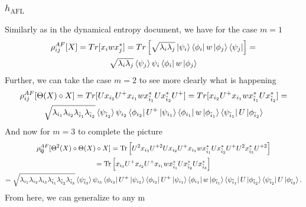 \documentclass{article}
\newcommand{\afl}{h_{\text{AFL}}}
\begin{document}
\subsubsection{$\afl$}
Similarly as in the dynamical entropy document, we have for the case $m = 1$ \begin{multline}
    \rho_{ij}^{AF}[X] = Tr[x_iwx_j^*] = Tr\left[\sqrt{\lambda_i\lambda_j}\ket{\psi_i}\bra{\phi_i}w\ket{\phi_j}\bra{\psi_j}\right] = \\\sqrt{\lambda_i\lambda_j} \braket{\psi_j}{\psi_i}\bra{\phi_i}w\ket{\phi_j}
\end{multline}
Further, we can take the case $m = 2$ to see more clearly what is happening
\begin{multline}
    \rho_{ij}^{AF}[\Theta(X)\circ X] = Tr[Ux_{i_2}U^+x_{i_1}wx_{\Tilde{i}_1}^*Ux_{\Tilde{i}_2}^*U^+] = Tr[x_{i_2}U^+x_{i_1}wx_{\Tilde{i}_1}^*Ux_{\Tilde{i}_2}^*] = \\ \sqrt{\lambda_{i_1}\lambda_{i_2}\lambda_{\Tilde{i}_1}\lambda_{\Tilde{i}_2}}\braket{\psi_{\Tilde{i}_2}}{\psi_{i_2}}\bra{\phi_{i_2}}U^+\ket{\psi_{i_1}}\bra{\phi_{i_1}}w\ket{\phi_{\Tilde{i}_1}}\bra{\psi_{\Tilde{i}_1}}U\ket{\phi_{\Tilde{i}_2}}
\end{multline}
And now for $m=3$ to complete the picture
\begin{multline}
\rho_{\mathbf{i}\mathbf{j}}^{AF}
[\Theta^2(X)\circ\Theta(X)\circ X]
=
\operatorname{Tr}\left[
U^2x_{i_3}U^{+2}Ux_{i_2}U^+x_{i_1}w
x_{\tilde{i}_1}^{*}Ux_{\tilde{i}_2}^{*}U^+
U^2x_{\tilde{i}_3}^{*}U^{+2}
\right]
\\
=
\operatorname{Tr}\left[
x_{i_3}U^+x_{i_2}U^+x_{i_1}w
x_{\tilde{i}_1}^{*}Ux_{\tilde{i}_2}^{*}Ux_{\tilde{i}_3}^{*}
\right]
\\
=
\sqrt{
\lambda_{i_1}\lambda_{i_2}\lambda_{i_3}
\lambda_{\tilde{i}_1}
\lambda_{\tilde{i}_2}
\lambda_{\tilde{i}_3}
}
\braket{\psi_{\tilde{i}_3}}{\psi_{i_3}}
\bra{\phi_{i_3}}U^+\ket{\psi_{i_2}}
\bra{\phi_{i_2}}U^+\ket{\psi_{i_1}}
\bra{\phi_{i_1}}w\ket{\phi_{\tilde{i}_1}}
\bra{\psi_{\tilde{i}_1}}U\ket{\phi_{\tilde{i}_2}}
\bra{\psi_{\tilde{i}_2}}U\ket{\phi_{\tilde{i}_3}}.
\end{multline}
From here, we can generalize to any m 
\end{document}
